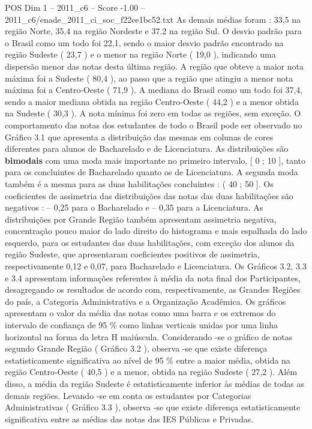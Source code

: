 \begin{textsample}{POS Dim 1 – 2011\_c6 – Score -1.00 – 2011\_c6/enade\_2011\_ci\_soc\_f22ee1bc52.txt}
As demais médias foram : 33,5 na região Norte, 35,4 na região Nordeste e 37.2 na região Sul.
O desvio padrão para o Brasil como um todo foi 22,1, sendo o maior desvio padrão encontrado na região Sudeste ( 23,7 ) e o menor na região Norte ( 19,0 ), indicando uma dispersão menor das notas desta última região.
A região que obteve a maior nota máxima foi a Sudeste ( 80,4 ), ao passo que a região que atingiu a menor nota máxima foi a Centro-Oeste ( 71,9 ).
A mediana do Brasil como um todo foi 37,4, sendo a maior mediana obtida na região Centro-Oeste ( 44,2 ) e a menor obtida na Sudeste ( 30,3 ).
A nota mínima foi zero em todas as regiões, sem exceção.
O comportamento das notas dos estudantes de todo o Brasil pode ser observado no Gráfico 3.1 que apresenta a distribuição das mesmas em colunas de cores diferentes para alunos de Bacharelado e de Licenciatura.
As distribuições são \textbf{bimodais} com uma moda mais importante no primeiro intervalo, [ 0 ; 10 ], tanto para os concluintes de Bacharelado quanto os de Licenciatura.
A segunda moda também é a mesma para as duas habilitações concluintes : ( 40 ; 50 ].
Os coeficientes de assimetria das distribuições das notas das duas habilitações são negativos : – 0,25 para o Bacharelado e – 0,35 para a Licenciatura.
As distribuições por Grande Região também apresentam assimetria negativa, concentração pouco maior do lado direito do histograma e mais espalhada do lado esquerdo, para os estudantes das duas habilitações, com exceção dos alunos da região Sudeste, que apresentaram coeficientes positivos de assimetria, respectivamente 0,12 e 0,07, para Bacharelado e Licenciatura.
Os Gráficos 3.2, 3.3 e 3.4 apresentam informações referentes à média da nota final dos Participantes, desagregando os resultados de acordo com, respectivamente, as Grandes Regiões do país, a Categoria Administrativa e a Organização Acadêmica.
Os gráficos apresentam o valor da média das notas como uma barra e os extremos do intervalo de confiança de 95 \% como linhas verticais unidas por uma linha horizontal na forma da letra H maiúscula.
Considerando -se o gráfico de notas segundo Grande Região ( Gráfico 3.2 ), observa -se que existe diferença estatisticamente significativa ao nível de 95 \% entre a maior média, obtida na região Centro-Oeste ( 40,5 ) e a menor, obtida na região Sudeste ( 27,2 ).
Além disso, a média da região Sudeste é estatisticamente inferior às médias de todas as demais regiões.
Levando -se em conta os estudantes por Categorias Administrativas ( Gráfico 3.3 ), observa -se que existe diferença estatisticamente significativa entre as médias das notas das IES Públicas e Privadas.

\end{textsample}

